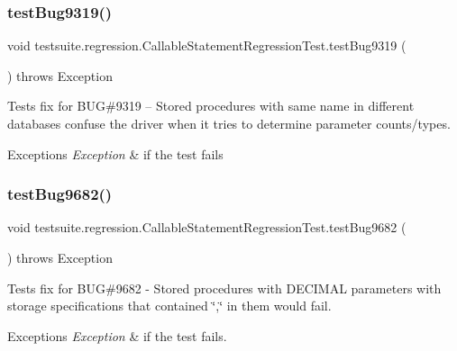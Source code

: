 \subsubsection{\texorpdfstring{test\+Bug9319()}{testBug9319()}}
{\footnotesize\ttfamily void testsuite.\+regression.\+Callable\+Statement\+Regression\+Test.\+test\+Bug9319 (\begin{DoxyParamCaption}{ }\end{DoxyParamCaption}) throws Exception}

Tests fix for B\+UG\#9319 -- Stored procedures with same name in different databases confuse the driver when it tries to determine parameter counts/types.


\begin{DoxyExceptions}{Exceptions}
{\em Exception} & if the test fails \\
\hline
\end{DoxyExceptions}
\mbox{\label{classtestsuite_1_1regression_1_1_callable_statement_regression_test_aa84b6f7f456f3d576c6d8c22213a24b2}} 
\subsubsection{\texorpdfstring{test\+Bug9682()}{testBug9682()}}
{\footnotesize\ttfamily void testsuite.\+regression.\+Callable\+Statement\+Regression\+Test.\+test\+Bug9682 (\begin{DoxyParamCaption}{ }\end{DoxyParamCaption}) throws Exception}

Tests fix for B\+UG\#9682 -\/ Stored procedures with D\+E\+C\+I\+M\+AL parameters with storage specifications that contained \char`\"{},\char`\"{} in them would fail.


\begin{DoxyExceptions}{Exceptions}
{\em Exception} & if the test fails. \\
\hline
\end{DoxyExceptions}
\mbox{\label{classtestsuite_1_1regression_1_1_callable_statement_regression_test_af2d71c7927c0532faaec78a0d07f1646}} 
